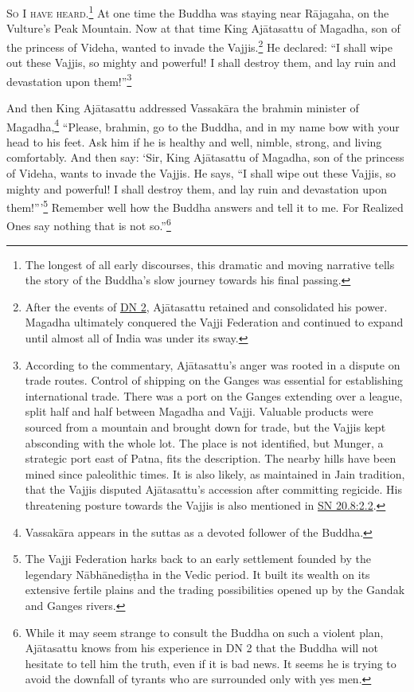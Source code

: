 \documentclass[12pt,openany]{book}%
\newcommand*{\scevam}[1]{\textsc{#1}}
\begin{document}
\scevam{So I have heard.\footnote{The longest of all early discourses, this dramatic and moving narrative tells the story of the Buddha’s slow journey towards his final passing. } }At one time the Buddha was staying near \textsanskrit{Rājagaha}, on the Vulture’s Peak Mountain. Now at that time King \textsanskrit{Ajātasattu} of Magadha, son of the princess of Videha, wanted to invade the Vajjis.\footnote{After the events of \href{https://suttacentral.net/dn2/en/sujato}{DN 2}, \textsanskrit{Ajātasattu} retained and consolidated his power. Magadha ultimately conquered the Vajji Federation and continued to expand until almost all of India was under its sway. } He declared: “I shall wipe out these Vajjis, so mighty and powerful! I shall destroy them, and lay ruin and devastation upon them!”\footnote{According to the commentary, \textsanskrit{Ajātasattu}’s anger was rooted in a dispute on trade routes. Control of shipping on the Ganges was essential for establishing international trade. There was a port on the Ganges extending over a league, split half and half between Magadha and Vajji. Valuable products were sourced from a mountain and brought down for trade, but the Vajjis kept absconding with the whole lot. The place is not identified, but Munger, a strategic port east of Patna, fits the description. The nearby hills have been mined since paleolithic times. It is also likely, as maintained in Jain tradition, that the Vajjis disputed \textsanskrit{Ajātasattu}’s accession after committing regicide. His threatening posture towards the Vajjis is also mentioned in \href{https://suttacentral.net/sn20.8/en/sujato\#2.2}{SN 20.8:2.2}. } 

And then King \textsanskrit{Ajātasattu} addressed \textsanskrit{Vassakāra} the brahmin minister of Magadha,\footnote{\textsanskrit{Vassakāra} appears in the suttas as a devoted follower of the Buddha. } “Please, brahmin, go to the Buddha, and in my name bow with your head to his feet. Ask him if he is healthy and well, nimble, strong, and living comfortably. And then say: ‘Sir, King \textsanskrit{Ajātasattu} of Magadha, son of the princess of Videha, wants to invade the Vajjis. He says, “I shall wipe out these Vajjis, so mighty and powerful! I shall destroy them, and lay ruin and devastation upon them!”’\footnote{The Vajji Federation harks back to an early settlement founded by the legendary \textsanskrit{Nābhānediṣṭha} in the Vedic period. It built its wealth on its extensive fertile plains and the trading possibilities opened up by the Gandak and Ganges rivers. } Remember well how the Buddha answers and tell it to me. For Realized Ones say nothing that is not so.”\footnote{While it may seem strange to consult the Buddha on such a violent plan, \textsanskrit{Ajātasattu} knows from his experience in DN 2 that the Buddha will not hesitate to tell him the truth, even if it is bad news. It seems he is trying to avoid the downfall of tyrants who are surrounded only with yes men. } 
\end{document}
